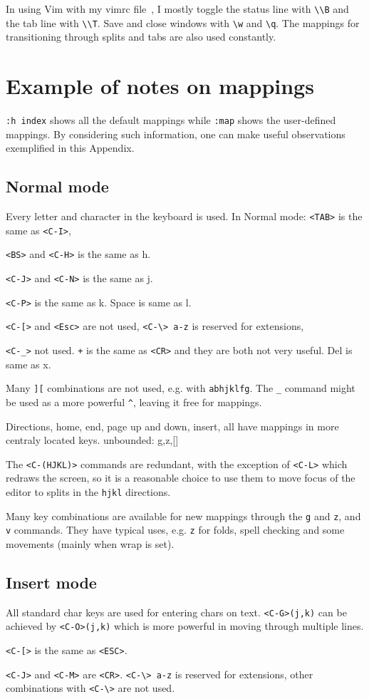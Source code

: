 \documentclass{article}
\newcommand{\ttt}[1] {
	\texttt{<#1>}}
\newcommand{\tttt}[1]{\texttt{#1}}
\begin{document}
In using Vim with my vimrc file~\cite{vimrc},
I mostly toggle the status line with \texttt{\textbackslash\textbackslash B}
and the tab line with \texttt{\textbackslash\textbackslash T}.
Save and close windows with \texttt{\textbackslash w} and \texttt{\textbackslash q}.
The mappings for transitioning through splits and tabs
are also used constantly.

\section{Example of notes on mappings}\label{notes}
\texttt{:h index} shows all the default mappings
while \tttt{:map} shows the user-defined mappings.
By considering such information, one can make
useful observations exemplified in this Appendix.

\subsection{Normal mode}
Every letter and character in the keyboard is used.
In Normal mode: \ttt{TAB} is the same as \ttt{C-I},
\ttt{BS} and \ttt{C-H} is the same as h.
\ttt{C-J} and \ttt{C-N} is the same as j.
\ttt{C-P} is the same as k.
Space is same as l.
\ttt{C-[} and \ttt{Esc} are not used,
\tttt{<C-\textbackslash> a-z} is reserved for extensions,
\ttt{C-\_} not used.
\tttt{+} is the same as \ttt{CR} and they are both not very useful.
Del is same as x.

Many \tttt{][} combinations are not used, e.g.
with \tttt{abhjklfg}.
The \tttt{\_} command might be used as a more powerful \tttt{\^},
leaving it free for mappings.

Directions, home, end, page up and down, insert, all have mappings
in more centraly located keys.
unbounded: g,z,[]

The \ttt{C-(HJKL)} commands are redundant,
with the exception of \ttt{C-L} which redraws the screen,
so it is a reasonable choice to use them to move focus
of the editor to splits in the \tttt{hjkl} directions.

Many key combinations are available for new mappings through the \tttt{g}
and \tttt{z}, and \tttt{v} commands.
They have typical uses, e.g. \tttt{z} for folds,
spell checking and some movements (mainly when wrap is set).

\subsection{Insert mode}
All standard char keys are used for entering chars on text.
\tttt{<C-G>(j,k)} can be achieved by \tttt{<C-O>(j,k)} which is more powerful
in moving through multiple lines.
\ttt{C-[} is the same as \ttt{ESC}.
\ttt{C-J} and \ttt{C-M} are \ttt{CR}.
\tttt{<C-\textbackslash> a-z} is reserved for extensions,
other combinations with \ttt{C-\textbackslash} are not used.
\end{document}
